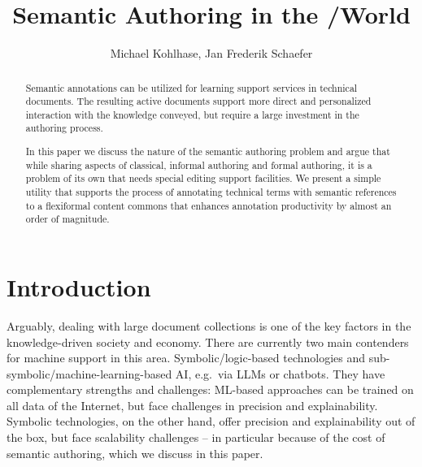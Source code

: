 \documentclass{llncs}
\title{
    Semantic Authoring in the \sTeX/\ALeA World
    \ednote{Find better title. Was ``Bulk Semantic Annotation with a Partially Known Knowledge Base''
}}
\author{Michael Kohlhase, Jan Frederik Schaefer}
\institute{Computer Science, FAU Erlangen N\"urnberg, Germany}
\begin{document}
\maketitle
\begin{abstract}
  Semantic annotations can be utilized for learning support services in technical
  documents. The resulting active documents support more direct and personalized
  interaction with the knowledge conveyed, but require a large investment in the authoring
  process.

  In this paper we discuss the nature of the semantic authoring problem and argue that
  while sharing aspects of classical, informal authoring and formal authoring, it is a
  problem of its own that needs special editing support facilities. We present a simple
  utility that supports the process of annotating technical terms with semantic references
  to a flexiformal content commons that enhances annotation productivity by almost an
  order of magnitude.
\end{abstract}

\section{Introduction}
Arguably, dealing with large document collections is one of the key factors in the knowledge-driven society and economy.
There are currently two main contenders for machine support in this area.
Symbolic/logic-based technologies and sub-symbolic/machine-learning-based AI, e.g.\ via LLMs or chatbots.
They have complementary strengths and challenges:
ML-based approaches can be trained on all data of the Internet, but face challenges in precision and explainability. 
Symbolic technologies, on the other hand, offer precision and explainability out of the box, but face scalability challenges
-- in particular because of the cost of semantic authoring, which we discuss in this paper.
\end{document}
